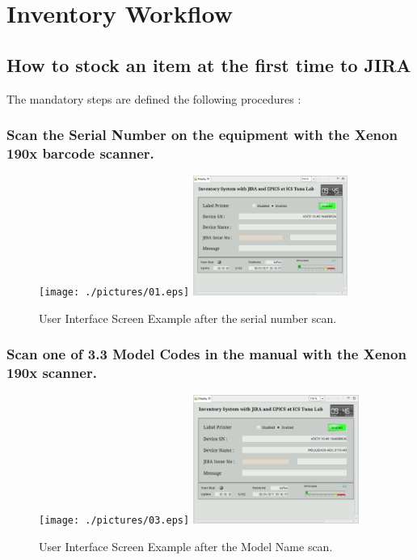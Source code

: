 \documentclass[11pt
  , a4paper
  , article
  , oneside
  , showtrims
]{memoir}
\begin{document}
\clearpage
\section{Inventory Workflow}

\subsection{How to stock an item at the first time to JIRA}

The mandatory steps are defined the following procedures :

\subsubsection{Scan the Serial Number on the equipment  with the Xenon 190x barcode scanner.}
\begin{figure}[!htb]
  \centering
  \texttt{[image: ./pictures/01.eps]}
  \includegraphics[width=0.45\textwidth]{./pictures/02.eps}
  \caption{
    User Interface Screen Example after the serial number scan. 
  }
\end{figure}

\subsubsection{Scan  one of 3.3 Model Codes in the manual with the Xenon 190x scanner.}
\begin{figure}[!htb]
  \centering
  \texttt{[image: ./pictures/03.eps]}
  \includegraphics[width=0.484\textwidth]{./pictures/04.eps}
  \caption{
    User Interface Screen Example after the Model Name scan. 
  }
\end{figure}
\end{document}
